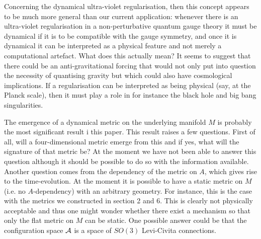 \documentclass[letterpaper,11pt]{article}
\def\ca{{\cal A}}
\def\cf{{\cal F}}
\begin{document}
Concerning the dynamical ultra-violet regularisation, then this concept appears to be much more general than our current application: whenever there is an ultra-violet regularisation in a non-perturbative quantum gauge theory it must be dynamical if it is to be compatible with the gauge symmetry, and once it is dynamical it can be interpreted as a physical feature and not merely a computational artefact. What does this actually mean? It seems to suggest that there could be an anti-gravitational forcing that would not only put into question the necessity of quantising gravity but which could also have cosmological implications. If a regularisation can be interpreted as being physical (say, at the Planck scale), then it must play a role in for instance the black hole and big bang singularities. %


The emergence of a dynamical metric on the underlying manifold $M$ is probably the most significant result i this paper. This result raises a few questions. First of all, will a four-dimensional metric emerge from this and if yes, what will the signature of that metric be? At the moment we have not been able to answer this question although it should be possible to do so with the information available. Another question comes from the dependency of the metric on $A$, which gives rise to the time-evolution. At the moment it is possible to have a static metric on $M$ (i.e. no $A$-dependency) with an arbitrary geometry. For instance, this is the case with the metrics we constructed in section 2 and 6. This is clearly not physically acceptable and thus one might wonder whether there exist a mechanism so that only the flat metric on $M$ can be static. One possible answer could be that the configuration space $\ca$ is a space of $SO(3)$ Levi-Civita connections.


\end{document}

